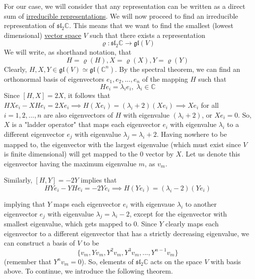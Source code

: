   For our case, we will consider that any representation can be written as a direct sum of \hyperref[def:irreducible-representation]{irreducible representations}. We will now proceed to find an irreducible representation of $\mathfrak{sl}_2 \mathbb{C}$. This means that we want to find the smallest (lowest dimensional) \hyperref[lin-def:vector-space]{vector space} $V$ such that there exists a representation
  \begin{equation}
    \varrho: \mathfrak{sl}_2 \mathbb{C} \rightarrow \mathfrak{gl}(V)
  \end{equation}
  We will write, as shorthand notation, that 
  \begin{equation}
    H = \varrho(H), X = \varrho(X), Y = \varrho(Y)
  \end{equation}
  Clearly, $H, X, Y \in \mathfrak{gl}(V) \simeq \mathfrak{gl}(\mathbb{C}^n)$. By the spectral theorem, we can find an orthonormal basis of eigenvectors $e_1, e_2, ..., e_n$ of the mapping $H$ such that
  \begin{equation}
    H e_i = \lambda_i e_i, \; \lambda_i \in \mathbb{C}
  \end{equation}
  Since $[H,X] = 2X$, it follows that $HX e_i - X H e_i = 2X e_i \implies H (X e_i) = (\lambda_i + 2) (X e_i) \implies Xe_i$ for all $i = 1, 2, ..., n$ are also eigenvectors of $H$ with eigenvalue $(\lambda_i + 2)$, or $X e_i = 0$. So, $X$ is a "ladder operator" that maps each eigenvector $e_i$ with eigenvalue $\lambda_i$ to a different eigenvector $e_j$ with eigenvalue $\lambda_j = \lambda_i + 2$. Having nowhere to be mapped to, the eigenvector with the largest eigenvalue (which must exist since $V$ is finite dimensional) will get mapped to the $0$ vector by $X$. Let us denote this eigenvector having the maximum eigenvalue $m$, as $v_m$. 

  Similarly, $[H,Y] = -2Y$ implies that
  \begin{equation}
    HY e_i - YH e_i = -2Y e_i \implies H(Y e_i) = (\lambda_i - 2)(Y e_i)
  \end{equation}

  implying that $Y$ maps each eigenvector $e_i$ with eigenvaue $\lambda_i$ to another eigenvector $e_j$ with eigenvalue $\lambda_j = \lambda_i - 2$, except for the eigenvector with smallest eigenvalue, which gets mapped to $0$. Since $Y$ clearly maps each eigenvector to a different eigenvector that has a strictly decreasing eigenvalue, we can construct a basis of $V$ to be
  \begin{equation}
    \{v_m, Y v_m, Y^2 v_m, Y^3 v_m, ..., Y^{n-1} v_m\}
  \end{equation}
  (remember that $Y^n v_m = 0$). So, elements of $\mathfrak{sl}_2 \mathbb{C}$ acts on the space $V$ with basis above. To continue, we introduce the following theorem. 

